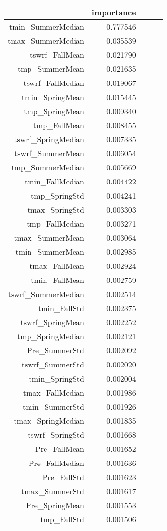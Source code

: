 \begin{tabular}{rrrrr}
\toprule
 & importance \\
\midrule
tmin_SummerMedian & 0.777546 \\
tmax_SummerMedian & 0.035539 \\
tswrf_FallMean & 0.021790 \\
tmp_SummerMean & 0.021635 \\
tswrf_FallMedian & 0.019067 \\
tmin_SpringMean & 0.015445 \\
tmp_SpringMean & 0.009340 \\
tmp_FallMean & 0.008455 \\
tswrf_SpringMedian & 0.007335 \\
tswrf_SummerMean & 0.006054 \\
tmp_SummerMedian & 0.005669 \\
tmin_FallMedian & 0.004422 \\
tmp_SpringStd & 0.004241 \\
tmax_SpringStd & 0.003303 \\
tmp_FallMedian & 0.003271 \\
tmax_SummerMean & 0.003064 \\
tmin_SummerMean & 0.002985 \\
tmax_FallMean & 0.002924 \\
tmin_FallMean & 0.002759 \\
tswrf_SummerMedian & 0.002514 \\
tmin_FallStd & 0.002375 \\
tswrf_SpringMean & 0.002252 \\
tmp_SpringMedian & 0.002121 \\
Pre_SummerStd & 0.002092 \\
tswrf_SummerStd & 0.002020 \\
tmin_SpringStd & 0.002004 \\
tmax_FallMedian & 0.001986 \\
tmin_SummerStd & 0.001926 \\
tmax_SpringMedian & 0.001835 \\
tswrf_SpringStd & 0.001668 \\
Pre_FallMean & 0.001652 \\
Pre_FallMedian & 0.001636 \\
Pre_FallStd & 0.001623 \\
tmax_SummerStd & 0.001617 \\
Pre_SpringMean & 0.001553 \\
tmp_FallStd & 0.001506 \\

\end{tabular}
